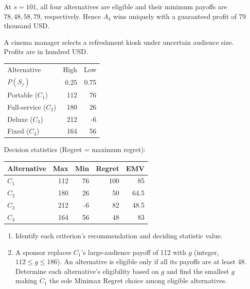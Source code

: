 At $s=101$, all four alternatives are eligible and their minimum
payoffs are $78,48,58,79$, respectively. Hence $A_4$ wins uniquely
with a guaranteed profit of 79 thousand USD.
\secInicio[sec:q1]



A cinema manager selects a refreshment kiosk under uncertain audience size. Profits are in hundred USD.

\begin{center}\small\setlength{\tabcolsep}{4pt}
	\begin{tabular}{lrr}\toprule
		Alternative & High & Low\\
		$P(S_j)$ & 0.25 & 0.75\\ \midrule
				Portable ($C_1$) & 112 & 76\\
		Full-service ($C_2$) & 180 & 26\\
		Deluxe ($C_3$) & 212 & -6\\
		Fixed ($C_4$) & 164 & 56\\
		\bottomrule
	\end{tabular}
\end{center} \vspace{-3mm}

Decision statistics (Regret = maximum regret):

\begin{center}\small\setlength{\tabcolsep}{4pt}
	\begin{tabular}{lrrrr}\toprule
		Alternative & Max & Min & Regret & EMV\\ \midrule
				$C_1$ & 112 & 76 & 100 & 85\\
		$C_2$ & 180 & 26 & 50 & 64.5\\
		$C_3$ & 212 & -6 & 82 & 48.5\\
		$C_4$ & 164 & 56 & 48 & 83\\
		\bottomrule
	\end{tabular}
\end{center}

\begin{enumerate}[label=\textbf{(\alph*)},leftmargin=*]
	\item Identify each criterion's recommendation and deciding statistic value. 

	\item A sponsor replaces $C_1$'s large-audience payoff of 112 with $g$ (integer, $112\leq g\leq186$). An alternative is eligible only if all its payoffs are at least 48. Determine each alternative's eligibility based on $g$ and find the smallest $g$ making $C_1$ the sole Minimax Regret choice among eligible alternatives. 
\end{enumerate}
\label{sol:q2a}
